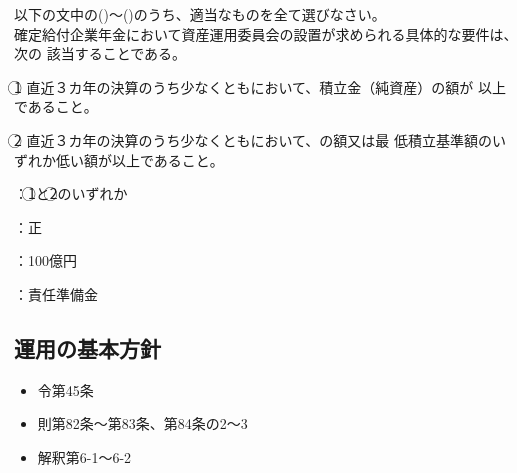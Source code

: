 \begin{truefalse}[年金2 2023 問題1(1)ウ]
  以下の文中の()〜()のうち、適当なものを全て選びなさい。
\\

  確定給付企業年金において資産運用委員会の設置が求められる具体的な要件は、次の
該当することである。

\textcircled{1} 直近３カ年の決算のうち少なくともにおいて、積立金（純資産）の額が
以上であること。

\textcircled{2}  直近３カ年の決算のうち少なくともにおいて、の額又は最
低積立基準額のいずれか低い額が以上であること。
\end{truefalse}

\begin{answerbox}
\end{answerbox}

\begin{explanationbox}
  ：\textcircled{1}と\textcircled{2}のいずれか

  ：正

  ：100億円

  ：責任準備金
\end{explanationbox}

\newpage

\subsection{運用の基本方針}


\begin{InyouJobunbox}
  \begin{itemize}
    \item 令第45条
    \item 則第82条〜第83条、第84条の2〜3
    \item 解釈第6-1〜6-2
  \end{itemize}
\end{InyouJobunbox}

